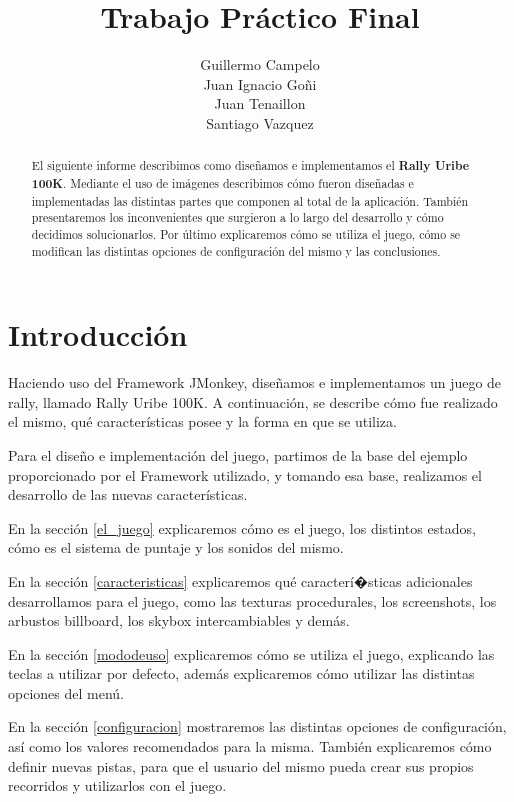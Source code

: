 \documentclass[a4paper,10pt]{article}
\title{Trabajo Pr\'actico Final}
\author{Guillermo Campelo\\Juan Ignacio Go\~ni\\Juan
Tenaillon\\Santiago Vazquez}
\begin{document}
\maketitle

\begin{abstract}
El siguiente informe describimos como dise\~namos e implementamos el
\textbf{Rally
Uribe
100K}. 
Mediante el uso de im\'agenes describimos c\'omo fueron dise\~nadas e
implementadas
las distintas partes que componen al total de la aplicaci\'on.  Tambi\'en
presentaremos los inconvenientes que surgieron a lo largo del desarrollo y
c\'omo decidimos solucionarlos.  Por \'ultimo explicaremos c\'omo se utiliza
el
juego,
c\'omo se modifican las distintas opciones de configuraci\'on del mismo y las
conclusiones.
\end{abstract}

\section{Introducci\'on}

Haciendo uso del Framework JMonkey, dise\~namos e implementamos un juego de
rally,
llamado Rally Uribe 100K.  A continuaci\'on, se describe c\'omo fue realizado el
mismo, qu\'e caracter\'isticas posee y la forma en que se utiliza.

Para el dise\~no e implementaci\'on del juego, partimos de la base del ejemplo
proporcionado por el Framework utilizado, y tomando esa base, realizamos
el desarrollo de las nuevas caracter\'isticas.

En la secci\'on \ref{el_juego} explicaremos c\'omo es el juego, los distintos
estados, c\'omo es el sistema de puntaje y los sonidos del mismo.

En la secci\'on \ref{caracteristicas} explicaremos qu\'e caracter\'i�sticas
adicionales desarrollamos para el juego, como las texturas procedurales,
los screenshots, los arbustos billboard, los skybox intercambiables y dem\'as.

En la secci\'on \ref{mododeuso} explicaremos c\'omo se utiliza el juego,
explicando
las teclas a utilizar por defecto, adem\'as explicaremos c\'omo utilizar las
distintas opciones del men\'u.

En la secci\'on \ref{configuracion} mostraremos las distintas opciones de
configuraci\'on, as\'i como los valores recomendados para la misma.  Tambi\'en
explicaremos c\'omo definir nuevas pistas, para que el usuario del mismo pueda
crear
sus propios recorridos y utilizarlos con el juego.
\end{document}
